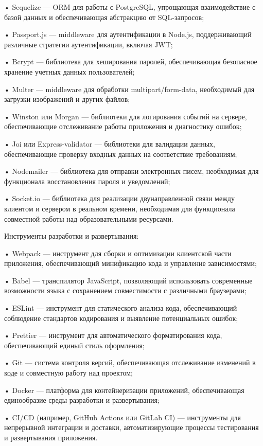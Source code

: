 {  \par \redline • Sequelize — ORM для работы с PostgreSQL, упрощающая взаимодействие с базой данных и обеспечивающая абстракцию от SQL-запросов;
  \par \redline • Passport.js — middleware для аутентификации в Node.js, поддерживающий различные стратегии аутентификации, включая JWT;
  \par \redline • Bcrypt — библиотека для хеширования паролей, обеспечивающая безопасное хранение учетных данных пользователей;
  \par \redline • Multer — middleware для обработки multipart/form-data, необходимый для загрузки изображений и других файлов;
  \par \redline • Winston или Morgan — библиотеки для логирования событий на сервере, обеспечивающие отслеживание работы приложения и диагностику ошибок;
  \par \redline • Joi или Express-validator — библиотеки для валидации данных, обеспечивающие проверку входных данных на соответствие требованиям;
  \par \redline • Nodemailer — библиотека для отправки электронных писем, необходимая для функционала восстановления пароля и уведомлений;
  \par \redline • Socket.io — библиотека для реализации двунаправленной связи между клиентом и сервером в реальном времени, необходимая для функционала совместной работы над образовательными ресурсами.

  \par \redline Инструменты разработки и развертывания:

  \par \redline • Webpack — инструмент для сборки и оптимизации клиентской части приложения, обеспечивающий минификацию кода и управление зависимостями;
  \par \redline • Babel — транспилятор JavaScript, позволяющий использовать современные возможности языка с сохранением совместимости с различными браузерами;
  \par \redline • ESLint — инструмент для статического анализа кода, обеспечивающий соблюдение стандартов кодирования и выявление потенциальных ошибок;
  \par \redline • Prettier — инструмент для автоматического форматирования кода, обеспечивающий единый стиль оформления;
  \par \redline • Git — система контроля версий, обеспечивающая отслеживание изменений в коде и совместную работу над проектом;
  \par \redline • Docker — платформа для контейнеризации приложений, обеспечивающая единообразие среды разработки и развертывания;
  \par \redline • CI/CD (например, GitHub Actions или GitLab CI) — инструменты для непрерывной интеграции и доставки, автоматизирующие процессы тестирования и развертывания приложения.

  \par
}

